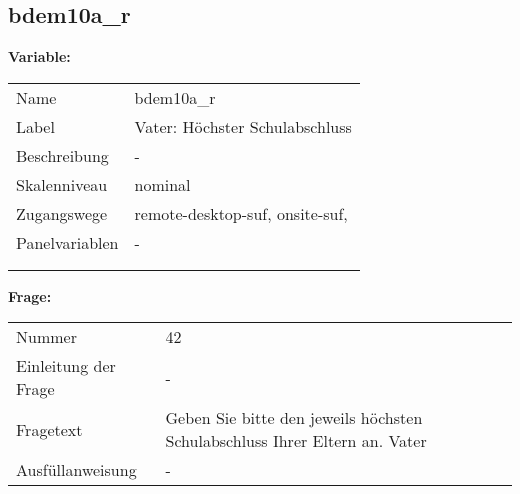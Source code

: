 	
	
	\subsection{bdem10a\_r}
	\label{subSection:bdem10a_r}

	\noindent\textbf{Variable:}\\
		\begin{tabular}{lL{11.3cm}}
			\label{tableVariable:bdem10a_r}
			Name & bdem10a\_r \\
			Label & Vater: Höchster Schulabschluss  \\
			Beschreibung & - \\
			Skalenniveau & nominal \\
			Zugangswege &
				remote-desktop-suf,
				onsite-suf,
 \\
			Panelvariablen & -
			 \\
			 \\
 \\
		\end{tabular}

		\vspace*{1 cm}
		\noindent\textbf{Frage:}\\
		\begin{tabular}{lL{11.3cm}}
			\label{tableQuestion:bdem10a_r}
			Nummer & 42 \\
			Einleitung der Frage & - \\
			Fragetext & Geben Sie bitte den jeweils höchsten Schulabschluss Ihrer Eltern an.
Vater \\
			Ausfüllanweisung & - \\
		\end{tabular}





